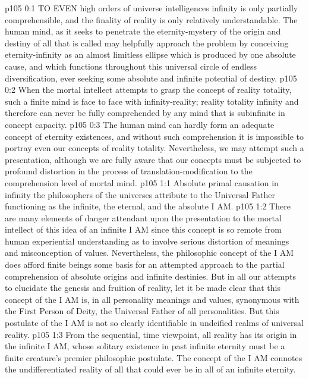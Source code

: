 \vs p105 0:1 TO EVEN high orders of universe intelligences infinity is only partially comprehensible, and the finality of reality is only relatively understandable. The human mind, as it seeks to penetrate the eternity\hyp{}mystery of the origin and destiny of all that is called  may helpfully approach the problem by conceiving eternity\hyp{}infinity as an almost limitless ellipse which is produced by one absolute cause, and which functions throughout this universal circle of endless diversification, ever seeking some absolute and infinite potential of destiny.
\vs p105 0:2 When the mortal intellect attempts to grasp the concept of reality totality, such a finite mind is face to face with infinity\hyp{}reality; reality totality  infinity and therefore can never be fully comprehended by any mind that is subinfinite in concept capacity.
\vs p105 0:3 The human mind can hardly form an adequate concept of eternity existences, and without such comprehension it is impossible to portray even our concepts of reality totality. Nevertheless, we may attempt such a presentation, although we are fully aware that our concepts must be subjected to profound distortion in the process of translation\hyp{}modification to the comprehension level of mortal mind.
\vs p105 1:1 Absolute primal causation in infinity the philosophers of the universes attribute to the Universal Father functioning as the infinite, the eternal, and the absolute I AM.
\vs p105 1:2 There are many elements of danger attendant upon the presentation to the mortal intellect of this idea of an infinite I AM since this concept is so remote from human experiential understanding as to involve serious distortion of meanings and misconception of values. Nevertheless, the philosophic concept of the I AM does afford finite beings some basis for an attempted approach to the partial comprehension of absolute origins and infinite destinies. But in all our attempts to elucidate the genesis and fruition of reality, let it be made clear that this concept of the I AM is, in all personality meanings and values, synonymous with the First Person of Deity, the Universal Father of all personalities. But this postulate of the I AM is not so clearly identifiable in undeified realms of universal reality.
\vs p105 1:3 \pc {} From the sequential, time viewpoint, all reality has its origin in the infinite I AM, whose solitary existence in past infinite eternity must be a finite creature’s premier philosophic postulate. The concept of the I AM connotes  the undifferentiated reality of all that could ever be in all of an infinite eternity.
